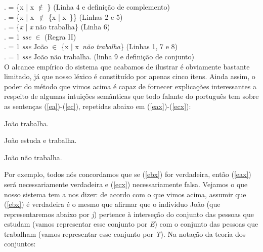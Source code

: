 .  = \{x | x $\not\in$
\} \hfill (Linha 4 e defini\-ção de complemento)\\

.  = \{x | x\ $\not\in$
\{x | x\ \}\} \hfill (Linhas 2 e 5)\\

.  = \{\textit{x} | \textit{x} não trabalha\} \hfill (Linha 6)\\

.  = 1 \textit{sse}  $\in$  \hfill
(Regra II)\\

.  = 1 \textit{sse} João $\in$ \{x | x\ \textit{não trabalha}\} \hfill (Linhas 1, 7 e 8)\\

.  = 1 \textit{sse} João não trabalha. \hfill (linha 9 e
defini\-ção de conjunto)\\

O alcance empírico do sistema que acabamos de ilustrar é
obviamente bastante limitado, já que nosso léxico é constituído
por apenas cinco itens. Ainda assim, o poder do método 
que vimos acima é capaz de fornecer explica\-çõ\-es interessantes
a respeito de algumas intui\-çõ\-es semânticas que todo falante do
português tem sobre as sen\-ten\-ças (\ref{ea})-(\ref{ec}), repetidas abaixo em (\ref{eax})-(\ref{ecx}):

\begin{exe}
	\ex João trabalha.\label{eax}
	\end{exe}

\begin{exe}
	\ex João estuda e trabalha.\label{ebx}
\end{exe}

\begin{exe}
	\ex João não trabalha.\label{ecx}
\end{exe}


\n Por exemplo,
todos nós concordamos que se (\ref{ebx}) for verdadeira, então
(\ref{eax}) será necessariamente verdadeira e (\ref{ecx})
necessariamente falsa. Vejamos o que nosso sistema tem a nos
dizer: de acordo com o que vimos acima, assumir que (\ref{ebx}) é
verdadeira é o mesmo que afirmar que o indivíduo João (que
representaremos abaixo por \textit{j}) pertence à interse\-ção do
conjunto das pessoas que estudam (vamos representar esse
conjunto por \textit{E}) com o conjunto das pessoas que trabalham
(vamos representar esse conjunto
por \textit{T}). Na nota\-ção da teoria dos conjuntos:\\

